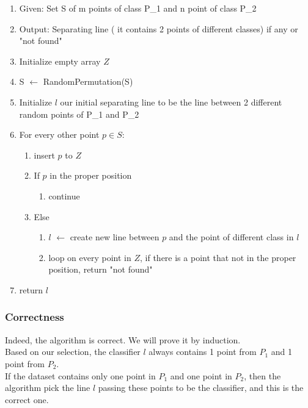 \begin{enumerate}
\item Given: Set S of m points of class P_1 and n point of class P_2  
\item Output: Separating line ( it contains 2 points of different classes) if any or "not found"

\item Initialize empty array $Z$
\item S $\leftarrow$ RandomPermutation(S) 
\item Initialize $l$ our initial separating line to be the line between 2 different random points of P_1 and P_2
\item For every other point  $p  \in S$:
\begin{enumerate}
    \item insert $p$ to $Z$
\item If $p$ in the proper position
\begin{enumerate}
\item continue 
\end{enumerate}
\item Else  
   \begin{enumerate}
\item $l$  $\leftarrow$ create new line between $p$ and the point of different class in $l$ 
\item loop on every point in $Z$, if there is a point that not in the proper position, return "not found"

\end{enumerate}    
        
\end{enumerate}

\item return $l$
\end{enumerate}

\subsubsection*{Correctness}
Indeed, the algorithm is correct. We will prove it by induction. \\ 

Based on our selection, the classifier $l$ always contains 1 point from $P_1$ and 1 point from $P_2$. \\

If the dataset contains only one point in $P_1$ and one point in $P_2$, then the algorithm pick the line $l$ passing these points to be the classifier, and this is the correct one. \\

